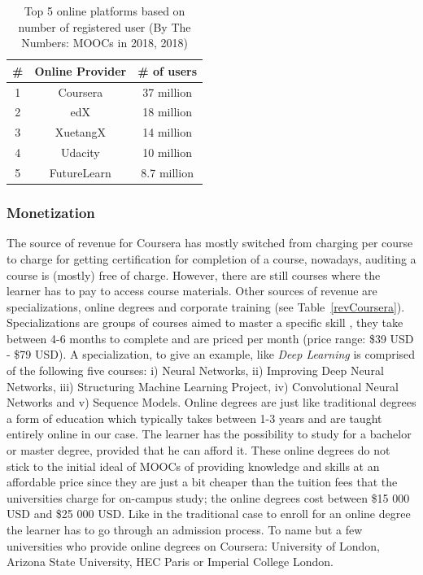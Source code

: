 \documentclass[11]{article}
\begin{document}
\begin{table}[H]
	\centering
	\begin{tabular}{|c|c|c|}
		\hline
		\textbf{\#} & \textbf{Online Provider} & \textbf{\# of users} \\
		\hline
		1 & Coursera & 37 million \\
		\hline
		2 & edX      & 18 million \\
		\hline
		3 & XuetangX & 14 million \\
		\hline
		4 & Udacity & 10 million \\
		\hline
		5 & FutureLearn & 8.7 million \\
		\hline
	\end{tabular}

	\caption{Top 5 online platforms based on number of registered user (By The Numbers: MOOCs in 2018, 2018)}
	\label{top5}

\end{table}


   	\subsubsection{Monetization\\}
	The source of revenue for Coursera has mostly switched from charging per course to charge for getting certification for completion of a course, nowadays, auditing a course is (mostly) free of charge. However, there are still courses where the learner has to pay to access course materials. Other sources of revenue are specializations, online degrees and corporate training (see Table~\ref{revCoursera}). Specializations are groups of courses aimed to master a specific skill , they take between 4-6 months to complete and are priced per month (price range: \$39 USD - \$79 USD). A specialization, to give an example, like \textit{Deep Learning} is comprised of the following five courses: i) Neural Networks, ii) Improving Deep Neural Networks, iii) Structuring Machine Learning Project, iv) Convolutional Neural Networks and v) Sequence Models. Online degrees are just like traditional degrees a form of education which typically takes between 1-3 years and are taught entirely online in our case. The learner has the possibility to study for a bachelor or master degree, provided that he can afford it. These online degrees do not stick to the initial ideal of MOOCs of providing knowledge and skills at an affordable price since they are just a bit cheaper than the tuition fees that the universities charge for on-campus study; the online degrees cost between \$15 000 USD and \$25 000 USD. Like in the traditional case to enroll for an online degree the learner has to go through an admission process. To name but a few universities who provide online degrees on Coursera: University of London, Arizona State University, HEC Paris or Imperial College London. \\
\end{document}
